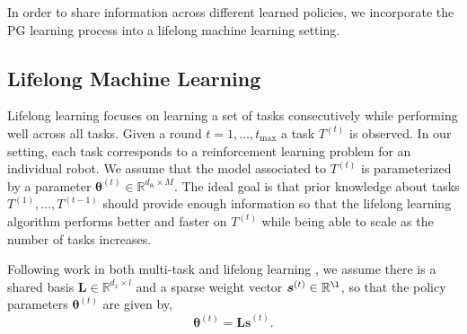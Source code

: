 \documentclass{aamas2016}
\renewcommand{\Re}{\mathbb{R}}
\begin{document}
In order to share information across different learned policies, we incorporate the PG learning process into a lifelong machine learning 
setting.





\subsection{Lifelong Machine Learning}

Lifelong learning focuses on learning a set of tasks consecutively while performing well across all tasks. Given a round $t = 1,\dots,t_{\max}$ a task $T^{(t)}$ is observed. In our setting, each task corresponds to a reinforcement learning problem for an individual robot. We assume that the model associated to $T^{(t)}$ is parameterized by a parameter $\boldsymbol{\theta}^{(t)} \in \Re^{d_{\theta_{t}}\times M}$. The ideal goal is that prior knowledge about tasks $T^{(1)},\ldots,T^{(t-1)}$ should provide enough information so that the lifelong learning algorithm performs better and faster on $T^{(t)}$ while being able to scale as the number of tasks increases.

Following work in both multi-task \cite{Kumar-2012} and lifelong learning \cite{Ruvolo2013}, we assume there is a shared basis $\boldsymbol{L}\in \Re^{d_{x}\times l}$ and a sparse weight vector $\boldsymbol{s}^{(t)}\in \Re^{\l}$, so that the policy parameters $\boldsymbol{\theta}^{(t)}$
are given by,
\begin{displaymath}
 \boldsymbol{\theta}^{(t)}=\boldsymbol{Ls}^{(t)}.
\end{displaymath}
\end{document}
